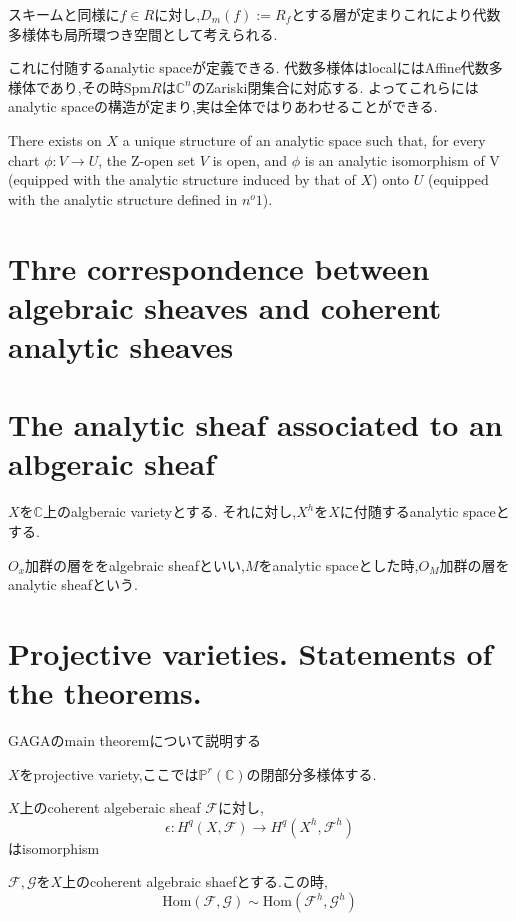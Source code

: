 \begin{rem}
  スキームと同様に$f \in R$に対し,$D_m(f):= R_f$とする層が定まりこれにより代数多様体も局所環つき空間として考えられる.
\end{rem}

これに付随するanalytic spaceが定義できる.
代数多様体はlocalにはAffine代数多様体であり,その時$\mathrm{Spm}R$は$\mathbb{C}^n$のZariski閉集合に対応する.
よってこれらにはanalytic spaceの構造が定まり,実は全体ではりあわせることができる.

\begin{prop}
There exists on $X$ a unique structure of an analytic space such
 that, for every chart $\phi : V \to U$, the Z-open set $V$ is open, and $\phi$ is an analytic
 isomorphism of V (equipped with the analytic structure induced by that of $X$)
 onto $U$ (equipped with the analytic structure defined in $n^o 1$).
\end{prop}

\section{Thre correspondence between algebraic sheaves and coherent analytic sheaves}

\section{The analytic sheaf associated to an albgeraic sheaf}
$X$を$\mathbb{C}$上のalgberaic varietyとする.
それに対し,$X^h$を$X$に付随するanalytic spaceとする.

$O_x$加群の層ををalgebraic sheafといい,$M$をanalytic spaceとした時,$O_{M}$加群の層をanalytic sheafという.


\section{Projective varieties. Statements of the theorems.}
GAGAのmain theoremについて説明する

$X$をprojective variety,ここでは$\mathbb{P}^r(\mathbb{C})$の閉部分多様体する.

\begin{thm}
$X$上のcoherent algeberaic sheaf $\mathcal{F}$に対し,
\begin{equation*}
 \epsilon: H^q(X, \mathcal{F}) \to H^q(X^h, \mathcal{F}^h)
\end{equation*}
はisomorphism
\end{thm}

\begin{thm}
$\mathcal{F}, \mathcal{G}$を$X$上のcoherent algebraic shaefとする.この時,
\begin{equation*}
 \mathrm{Hom}(\mathcal{F}, \mathcal{G}) \sim \mathrm{Hom}(\mathcal{F}^h, \mathcal{G}^h)
\end{equation*}
\end{thm}

